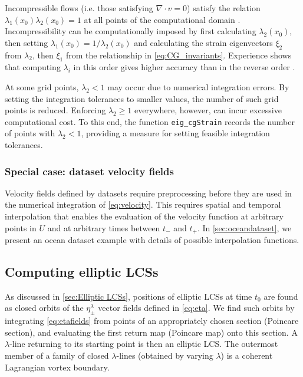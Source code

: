 \documentclass[5p]{elsarticle}
\begin{document}
Incompressible flows (i.e. those satisfying $\nabla \cdot v=0$) satisfy the relation $\lambda_1(x_0) \lambda_2(x_0) = 1$ at all points of the computational domain \citep{arnold78:_mathem}. Incompressibility can be computationally imposed by first calculating $\lambda_2(x_0)$, then setting $\lambda_1(x_0) = 1/\lambda_2(x_0)$ and calculating the strain eigenvectors $\xi_2$ from $\lambda_2$, then $\xi_1$ from the relationship in \cref{eq:CG_invariants}. Experience shows that computing $\lambda_i$ in this order gives higher accuracy than in the reverse order \citep{farazmand12:_comput_lagran}.

At some grid points, $\lambda_2 < 1$ may occur due to numerical integration errors. By setting the integration tolerances to smaller values, the number of such grid points is reduced. Enforcing $\lambda_2 \geq 1$ everywhere, however, can incur excessive computational cost. To this end, the function \lstinline!eig_cgStrain! records the number of points with $\lambda_2 < 1$, providing a measure for setting feasible integration tolerances.

\subsubsection{Special case: dataset velocity fields}

Velocity fields defined by datasets require preprocessing before they are used in the numerical integration of \cref{eq:velocity}. This requires spatial and temporal interpolation that enables the evaluation of the velocity function at arbitrary points in $U$ and at arbitrary times between $t_-$ and $t_+$. In \cref{sec:oceandataset}, we present an ocean dataset example with details of possible interpolation functions.

\subsection{Computing elliptic LCSs}

As discussed in \cref{sec:Elliptic LCSs}, positions of elliptic LCSs at time $t_0$ are found as closed orbits of the $\eta_\pm^\lambda$ vector fields defined in \cref{eq:eta}. We find such orbits by integrating \cref{eq:etafields} from points of an appropriately chosen section (Poincare section), and evaluating the first return map (Poincare map) onto this section. A $\lambda$-line returning to its starting point is then an elliptic LCS. The outermost member of a family of closed $\lambda$-lines (obtained by varying $\lambda$) is a coherent Lagrangian vortex boundary\citep{haller13:_coher_lagran,haller14:_adden_coher_lagran}.
\end{document}
